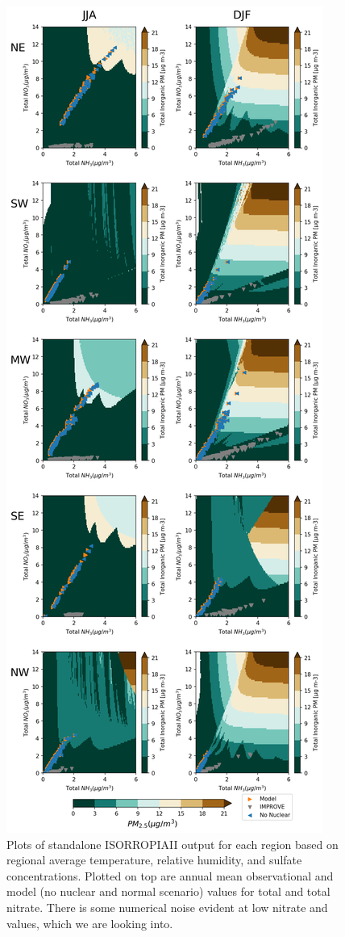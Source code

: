 \documentclass[12]{article}
\begin{document}
\begin{figure}[!htbp]
    \centering
    \includegraphics[height=0.95\textheight]{ego_nonuclear_project/Figures/isorropia_obs_plot.png}
    \caption{Plots of standalone ISORROPIAII output for each region based on regional average temperature, relative humidity, and sulfate concentrations. Plotted on top are annual mean observational and model (no nuclear and normal scenario) values for total  and total nitrate. There is some numerical noise evident at low nitrate and  values, which we are looking into.} 
    \label{fig:isorropia}
\end{figure}
\end{document}
